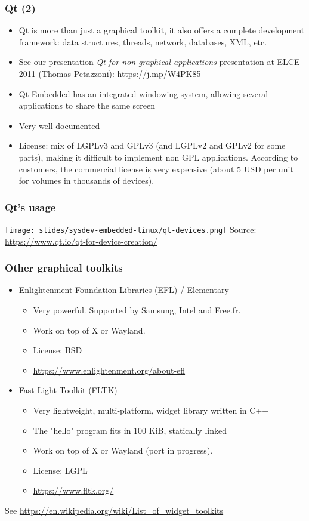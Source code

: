 \begin{frame}
  \frametitle{Qt (2)}
  \begin{itemize}
  \item Qt is more than just a graphical toolkit, it also offers a
    complete development framework: data structures, threads, network,
    databases, XML, etc.
  \item See our presentation {\em Qt for non graphical applications}
    presentation at ELCE 2011 (Thomas Petazzoni):
    \url{https://j.mp/W4PK85}
  \item Qt Embedded has an integrated windowing system, allowing
    several applications to share the same screen
  \item Very well documented
  \item License: mix of LGPLv3 and GPLv3 (and LGPLv2 and GPLv2 for some
        parts), making it difficult to implement non GPL applications.
        According to customers, the commercial license is very expensive
        (about 5 USD per unit for volumes in thousands of devices).
  \end{itemize}
\end{frame}

\begin{frame}
  \frametitle{Qt's usage}
  \texttt{[image: slides/sysdev-embedded-linux/qt-devices.png]}
  \vfill
  Source: \url{https://www.qt.io/qt-for-device-creation/}
\end{frame}

\begin{frame}
  \frametitle{Other graphical toolkits}
  \begin{itemize}
  \item Enlightenment Foundation Libraries (EFL) / Elementary
    \begin{itemize}
    \item Very powerful. Supported by Samsung, Intel and Free.fr.
    \item Work on top of X or Wayland.
    \item License: BSD
    \item \url{https://www.enlightenment.org/about-efl}
    \end{itemize}
  \item Fast Light Toolkit (FLTK)
    \begin{itemize}
    \item Very lightweight, multi-platform, widget library written in C++
    \item The "hello" program fits in 100 KiB, statically linked
    \item Work on top of X or Wayland (port in progress).
    \item License: LGPL
    \item \url{https://www.fltk.org/}
    \end{itemize}
  \end{itemize}
  See \url{https://en.wikipedia.org/wiki/List_of_widget_toolkits}
\end{frame}

